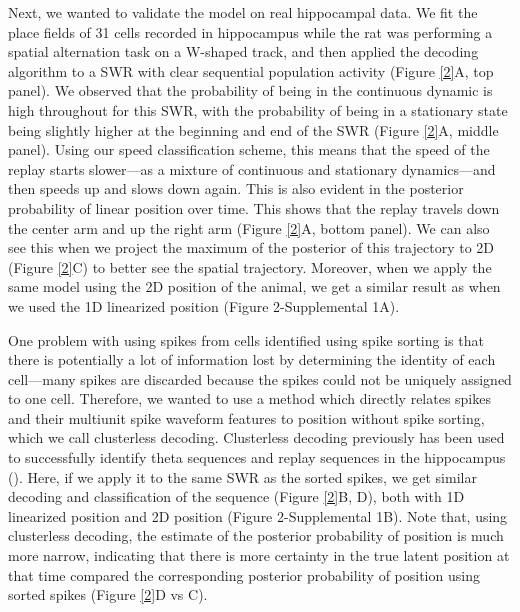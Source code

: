 \documentclass[times, twoside]{zHenriquesLab-StyleBioRxiv}
\begin{document}
Next, we wanted to validate the model on real hippocampal data. We fit the place fields of 31 cells recorded in hippocampus while the rat was performing a spatial alternation task on a W-shaped track, and then applied the decoding algorithm to a SWR with clear sequential population activity (Figure \ref{2}A, top panel). We observed that the probability of being in the continuous dynamic is high throughout for this SWR, with the probability of being in a stationary state being slightly higher at the beginning and end of the SWR (Figure \ref{2}A, middle panel). Using our speed classification scheme, this means that the speed of the replay starts slower---as a mixture of continuous and stationary dynamics---and then speeds up and slows down again. This is also evident in the posterior probability of linear position over time. This shows that the replay travels down the center arm and up the right arm (Figure \ref{2}A, bottom panel). We can also see this when we project the maximum of the posterior of this trajectory to 2D (Figure \ref{2}C) to better see the spatial trajectory. Moreover, when we apply the same model using the 2D position of the animal, we get a similar result as when we used the 1D linearized position (Figure 2-Supplemental 1A).

One problem with using spikes from cells identified using spike sorting is that there is potentially a lot of information lost by determining the identity of each cell---many spikes are discarded because the spikes could not be uniquely assigned to one cell. Therefore, we wanted to use a method which directly relates spikes and their multiunit spike waveform features to position without spike sorting, which we call clusterless decoding. Clusterless decoding previously has been used to successfully identify theta sequences and replay sequences in the hippocampus (\cite{KloostermanBayesiandecodingusing2014, ChenTransductiveneuraldecoding2012,DengRapidclassificationhippocampal2016, KayConstantSubsecondCycling2020}). Here, if we apply it to the same SWR as the sorted spikes, we get similar decoding and classification of the sequence (Figure \ref{2}B, D), both with 1D linearized position and 2D position (Figure 2-Supplemental 1B). Note that, using clusterless decoding, the estimate of the posterior probability of position is much more narrow, indicating that there is more certainty in the true latent position at that time compared the corresponding posterior probability of position using sorted spikes (Figure \ref{2}D vs C).
\end{document}
